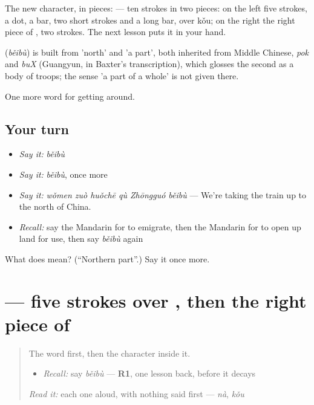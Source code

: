 The new character, in pieces:  — ten strokes in two pieces: on the left five strokes, a dot, a bar, two short strokes and a long bar, over  kǒu; on the right the right piece of , two strokes. The next lesson puts it in your hand.

\begin{cousinweb}
\textbf{} (\emph{běibù}) is built from  'north' and  'a part', both inherited from Middle Chinese, \emph{pok} and \emph{buX} (Guangyun, in Baxter's transcription), which glosses the second as a body of troops; the sense 'a part of a whole' is not given there.
\end{cousinweb}

\begin{grammarlens}[title={What you've built}]
One more word for getting around.
\end{grammarlens}

\subsection*{Your turn}
\begin{itemize}
\raggedright
  \item \emph{Say it:} \emph{běibù}
  \item \emph{Say it:} \emph{běibù}, once more
  \item \emph{Say it:} \emph{wǒmen zuò huǒchē qù Zhōngguó běibù} — We're taking the train up to the north of China.
  \item \emph{Recall:} say the Mandarin for to emigrate, then the Mandarin for to open up land for use, then say \emph{běibù} again
\end{itemize}

\begin{tcolorbox}[breakable,colback=teal!4,colframe=teal!35!black,title={Before you move on}]
What does  mean? (\textquotedblleft{}Northern part\textquotedblright{}.) Say it once more.
\end{tcolorbox}
\section[\texorpdfstring{\zh{部} (bù)}{部 (bù)}]{ — five strokes over , then the right piece of }

\label{lesson:ZH-W438-bu-part}



\begin{quote}
The word first, then the character inside it.

\begin{itemize}
\raggedright
  \item \emph{Recall:} say \emph{běibù} — \textbf{R1}, one lesson back, before it decays
\end{itemize}

\begin{quote}
 
\end{quote}

\emph{Read it:} each one aloud, with nothing said first — \emph{nà}, \emph{kǒu}
\end{quote}

